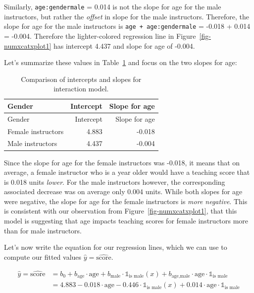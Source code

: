 \documentclass[
  letterpaper,
  DIV=11,
  numbers=noendperiod]{scrreprt}
\theoremstyle{definition}
\theoremstyle{remark}
\begin{document}
Similarly, \texttt{age:gendermale} = 0.014 is not the slope for age for
the male instructors, but rather the \emph{offset} in slope for the male
instructors. Therefore, the slope for age for the male instructors is
\texttt{age\ +\ age:gendermale} = -0.018 + 0.014 = -0.004. Therefore the
lighter-colored regression line in Figure~\ref{fig-numxcatxplot1} has
intercept 4.437 and slope for age of -0.004.

Let's summarize these values in Table~\ref{tbl-interaction-summary} and
focus on the two slopes for age:

\hypertarget{tbl-interaction-summary}{}
\begin{longtable}[]{@{}lrr@{}}
\caption{\label{tbl-interaction-summary}Comparison of intercepts and
slopes for interaction model.}\tabularnewline
\toprule()
Gender & Intercept & Slope for age \\
\midrule()
\endfirsthead
\toprule()
Gender & Intercept & Slope for age \\
\midrule()
\endhead
Female instructors & 4.883 & -0.018 \\
Male instructors & 4.437 & -0.004 \\
\bottomrule()
\end{longtable}

Since the slope for age for the female instructors was -0.018, it means
that on average, a female instructor who is a year older would have a
teaching score that is 0.018 units \emph{lower}. For the male
instructors however, the corresponding associated decrease was on
average only 0.004 units. While both slopes for age were negative, the
slope for age for the female instructors is \emph{more negative}. This
is consistent with our observation from Figure~\ref{fig-numxcatxplot1},
that this model is suggesting that age impacts teaching scores for
female instructors more than for male instructors.

Let's now write the equation for our regression lines, which we can use
to compute our fitted values \(\widehat{y} = \widehat{\text{score}}\).

\[
\begin{aligned}
\widehat{y} = \widehat{\text{score}} &= b_0 + b_{\mbox{age}} \cdot \mbox{age} + b_{\mbox{male}} \cdot \mathbb{1}_{\mbox{is male}}(x) + b_{\mbox{age,male}} \cdot \mbox{age} \cdot \mathbb{1}_{\mbox{is male}}\\
&= 4.883 -0.018 \cdot \mbox{age} - 0.446 \cdot \mathbb{1}_{\mbox{is male}}(x) + 0.014 \cdot \mbox{age} \cdot \mathbb{1}_{\mbox{is male}}
\end{aligned}
\]
\end{document}
